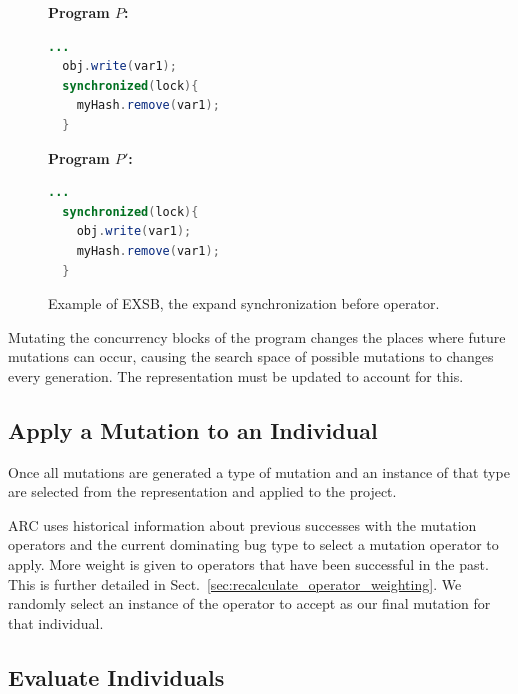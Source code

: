 \documentclass{llncs}
\begin{document}
\begin{figure}[h!]
\vspace{2mm}
\begin{minipage}{5cm}

\footnotesize{\textbf{ Program $P$:}}
\begin{lstlisting}[language=Java, morekeywords={synchronize}]
  ...
  obj.write(var1);
  synchronized(lock){
    myHash.remove(var1);
  }
\end{lstlisting}
\end{minipage}\hfill
\begin{minipage}{5cm}
\footnotesize{\textbf{ Program $P'$:}}
\begin{lstlisting}[language=Java, morekeywords={synchronize}]
  ...
  synchronized(lock){
    obj.write(var1);
    myHash.remove(var1);
  }
\end{lstlisting}
\end{minipage}

\caption{Example of EXSB, the expand synchronization before operator.}
\label{fig:EXSB_example}
\end{figure}

Mutating the concurrency blocks of the program changes the places where future
mutations can occur, causing the search space of possible mutations to changes
every generation. The representation must be updated to account for this.

\subsection{Apply a Mutation to an Individual}
\label{sec:mutate_individuals}

Once all mutations are generated a type of mutation and an instance of that
type are selected from the representation and applied to the project.

ARC uses historical information about previous successes with the mutation
operators and the current dominating bug type to select a mutation operator to
apply. More weight is given to operators that have been successful in the past.
This is further detailed in Sect.~\ref{sec:recalculate_operator_weighting}.
We randomly select an instance of the operator to accept as our final mutation
for that individual.

\subsection{Evaluate Individuals}
\label{sec:evalute_individuals}
\end{document}
